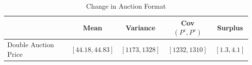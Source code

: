 \begin{table}[htbp]
\centering
\caption{Change in Auction Format}
\label{tab:cf}
\begin{tabular}{lcccc}
\hline\hline
 & Mean & Variance & Cov$(P^c, P^v)$ & Surplus \\
\hline
Double Auction Price & $[44.18, 44.83]$ & $[1173, 1328]$ & $[1232, 1310]$ & $[1.3, 4.1]$ \\
\hline\hline
\end{tabular}
\end{table}
